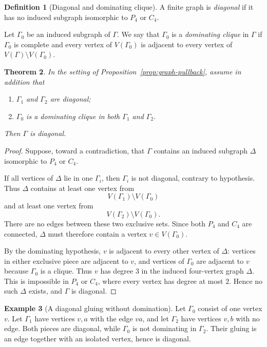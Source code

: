 \documentclass[12pt]{amsart}
\theoremstyle{plain}
\newtheorem{theorem}{Theorem}[section]
\theoremstyle{definition}
\newtheorem{definition}[theorem]{Definition}
\newtheorem{example}[theorem]{Example}
\theoremstyle{remark}
\numberwithin{equation}{section}
\begin{document}
\begin{definition}[Diagonal and dominating clique]
\label{def:diagonal-dominating}
A finite graph is \emph{diagonal} if it has no induced subgraph
isomorphic to \(P_4\) or \(C_4\).

Let \(\Gamma_0\) be an induced subgraph of \(\Gamma\). We say that
\(\Gamma_0\) is a \emph{dominating clique} in \(\Gamma\) if
\(\Gamma_0\) is complete and every vertex of \(V(\Gamma_0)\) is
adjacent to every vertex of
\(V(\Gamma)\setminus V(\Gamma_0)\).
\end{definition}

\begin{theorem}
\label{thm:diagonal-gluing}
In the setting of Proposition~\ref{prop:graph-pullback}, assume in
addition that
\begin{enumerate}[label=\textnormal{(\alph*)}]
\item \(\Gamma_1\) and \(\Gamma_2\) are diagonal;
\item \(\Gamma_0\) is a dominating clique in both
\(\Gamma_1\) and \(\Gamma_2\).
\end{enumerate}
Then \(\Gamma\) is diagonal.
\end{theorem}

\begin{proof}
Suppose, toward a contradiction, that \(\Gamma\) contains an induced
subgraph \(\Delta\) isomorphic to \(P_4\) or \(C_4\).

If all vertices of \(\Delta\) lie in one \(\Gamma_i\), then
\(\Gamma_i\) is not diagonal, contrary to hypothesis. Thus
\(\Delta\) contains at least one vertex from
\[
V(\Gamma_1)\setminus V(\Gamma_0)
\]
and at least one vertex from
\[
V(\Gamma_2)\setminus V(\Gamma_0).
\]
There are no edges between these two exclusive sets. Since both
\(P_4\) and \(C_4\) are connected, \(\Delta\) must therefore contain a
vertex \(v\in V(\Gamma_0)\).

By the dominating hypothesis, \(v\) is adjacent to every other vertex
of \(\Delta\): vertices in either exclusive piece are adjacent to
\(v\), and vertices of \(\Gamma_0\) are adjacent to \(v\) because
\(\Gamma_0\) is a clique. Thus \(v\) has degree \(3\) in the induced
four-vertex graph \(\Delta\). This is impossible in \(P_4\) or
\(C_4\), where every vertex has degree at most \(2\). Hence no such
\(\Delta\) exists, and \(\Gamma\) is diagonal.
\end{proof}

\begin{example}[A diagonal gluing without domination]
Let \(\Gamma_0\) consist of one vertex \(v\). Let \(\Gamma_1\) have
vertices \(v,a\) with the edge \(va\), and let \(\Gamma_2\) have vertices
\(v,b\) with no edge. Both pieces are diagonal, while \(\Gamma_0\) is not
dominating in \(\Gamma_2\). Their gluing is an edge together with an
isolated vertex, hence is diagonal.
\end{example}
\end{document}
